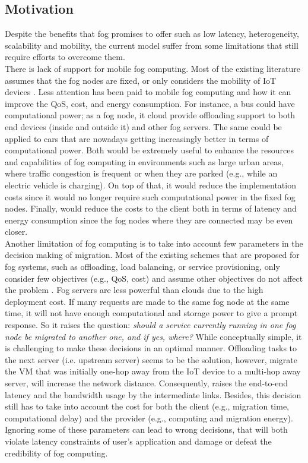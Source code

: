 \subsection{Motivation}\label{subsec:Motivation}
\noindent\tab Despite the benefits that fog promises to offer such as low latency, heterogeneity, scalability and mobility, the current model suffer from some limitations that still require efforts to overcome them.\\
\noindent\tab There is lack of support for mobile fog computing. Most of the existing literature assumes that the fog nodes are fixed, or only considers the mobility of IoT devices \cite{yousefpour2018all}. Less attention has been paid to mobile fog computing and how it can improve the QoS, cost, and energy consumption. For instance, a bus could have computational power; as a fog node, it cloud provide offloading support to both end devices (inside and outside it) and other fog servers. The same could be applied to cars that are nowadays getting increasingly better in terms of computational power. Both would be extremely useful to enhance the resources and capabilities of fog computing in environments such as large urban areas, where traffic congestion is frequent or when they are parked (e.g., while an electric vehicle is charging). On top of that, it would reduce the implementation costs since it would no longer require such computational power in the fixed fog nodes. Finally, would reduce the costs to the client both in terms of latency and energy consumption since the fog nodes where they are connected may be even closer.\\
\noindent\tab Another limitation of fog computing is to take into account few parameters in the decision making of migration. Most of the existing schemes that are proposed for fog systems, such as offloading, load balancing, or service provisioning, only consider few objectives (e.g., QoS, cost) and assume other objectives do not affect the problem \cite{yousefpour2018all}. Fog servers are less powerful than clouds due to the high deployment cost. If many requests are made to the same fog node at the same time, it will not have enough computational and storage power to give a prompt response. So it raises the question: \textit{should a service currently running in one fog node be migrated to another one, and if yes, where?} While conceptually simple, it is challenging to make these decisions in an optimal manner. Offloading tasks to the next server (i.e. upstream server) seems to be the solution, however, migrate the VM that was initially one-hop away from the IoT device to a multi-hop away server, will increase the network distance. Consequently, raises the end-to-end latency and the bandwidth usage by the intermediate links. Besides, this decision still has to take into account the cost for both the client (e.g., migration time, computational delay) and the provider (e.g., computing and migration energy). Ignoring some of these parameters can lead to wrong decisions, that will both violate latency constraints of user's application and damage or defeat the credibility of fog computing.
